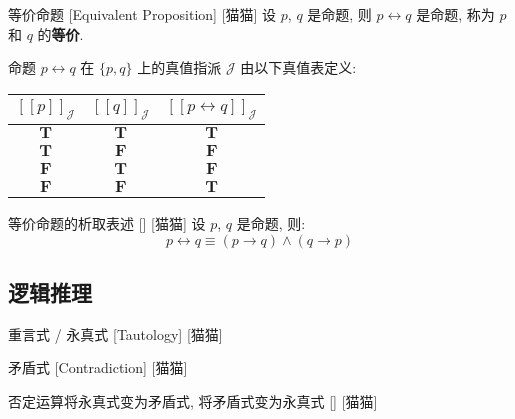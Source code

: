 \documentclass[UTF8]{ctexart}
\newcommand{\LT}{\ensuremath{\mathbf{T}}}
\newcommand{\LF}{\ensuremath{\mathbf{F}}}
\newcommand{\assign}[2]{\ensuremath{{[\![#1]\!]}_{#2}}}
\begin{document}
            \begin{dfn}
                []
                {等价命题}
                [Equivalent Proposition]
                [猫猫]
                设 \(p\), \(q\) 是命题, 则 \(p\leftrightarrow q\) 是命题, 称为 \(p\) 和 \(q\) 的\textbf{等价}. 

                命题 \(p\leftrightarrow q\) 在 \(\{p,q\}\) 上的真值指派 \(\mathcal{J}\) 由以下真值表定义: 
                \begin{center}
                \begin{tabular}{|c|c|c|}
                    \hline
                    \(\assign{p}{\mathcal{J}}\) & \(\assign{q}{\mathcal{J}}\) & \(\assign{p\leftrightarrow q}{\mathcal{J}}\) \\
                    \hline
                    \LT & \LT & \LT \\
                    \LT & \LF & \LF \\
                    \LF & \LT & \LF \\
                    \LF & \LF & \LT \\
                    \hline
                \end{tabular}
                \end{center}
            \end{dfn}

            \begin{ppt}
                []
                {等价命题的析取表述}
                []
                [猫猫]
                设 \(p\), \(q\) 是命题, 则: 
                \[p\leftrightarrow q\equiv(p\to q)\land(q\to p)\]
            \end{ppt}

        \subsection{逻辑推理}

            \begin{dfn}
                []
                {重言式 / 永真式}
                [Tautology]
                [猫猫]
            \end{dfn}

            \begin{dfn}
                []
                {矛盾式}
                [Contradiction]
                [猫猫]
            \end{dfn}

            \begin{ppt}
                []
                {否定运算将永真式变为矛盾式, 将矛盾式变为永真式}
                []
                [猫猫]
            \end{ppt}
\end{document}
